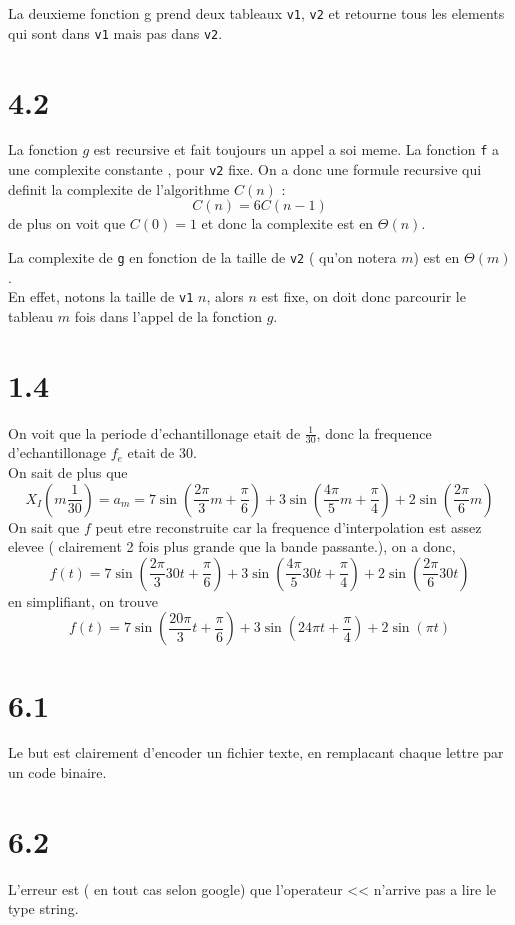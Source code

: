 \documentclass[11pt, a4paper, twoside]{article}
\begin{document}
La deuxieme fonction g prend deux tableaux \texttt{v1}, \texttt{v2} et retourne tous les elements qui sont dans \texttt{v1} mais pas dans \texttt{v2}.
\section*{4.2}
La fonction $g$ est recursive et fait toujours un appel a soi meme.
La fonction \texttt{f} a une complexite constante , pour \texttt{v2} fixe.
On a donc une formule recursive qui definit la complexite de l'algorithme $C( n) $  :
\[ 
	C( n) = 6C( n-1) 
\]
de plus on voit que $C( 0) =1$ et donc la complexite est en $\Theta( n) $.

La complexite de \texttt{g} en fonction de la taille de \texttt{v2} ( qu'on notera  $m$) est en $\Theta( m) $.\\
En effet, notons la taille de \texttt{v1}  $n$, alors $n$ est fixe, on doit donc parcourir le tableau $m$ fois dans l'appel de la fonction $g$.
\section*{1.4}
On voit que la periode d'echantillonage etait de $\frac{1}{30}$, donc la frequence d'echantillonage $f_e$ etait de $30$.\\
On sait de plus que
\[ 
	X_I( m \frac{1}{30}) = a_m = 7 \sin ( \frac{2\pi}{3}m + \frac{\pi}{6}) + 3 \sin ( \frac{4\pi}{5}m + \frac{\pi}{4}) + 2 \sin ( \frac{2\pi}{6}m) 
\]
On sait que $f$ peut etre reconstruite car la frequence d'interpolation est assez elevee ( clairement  2 fois plus grande que la bande passante.), on a donc,
\[ 
	f( t) = 7 \sin ( \frac{2\pi}{3}30 t + \frac{\pi}{6}) + 3 \sin ( \frac{4\pi}{5}30t + \frac{\pi}{4}) + 2 \sin ( \frac{2\pi}{6}30t) 
\]
en simplifiant, on trouve
\[ 
	f( t) = 7 \sin ( \frac{20\pi}{3} t + \frac{\pi}{6}) + 3 \sin ( 24\pi t + \frac{\pi}{4}) + 2 \sin ( \pi t) 
\]
\section*{6.1}
Le but est clairement d'encoder un fichier texte, en remplacant chaque lettre par un code binaire.
\section*{6.2}
L'erreur est ( en tout cas selon google) que l'operateur << n'arrive pas a lire le type string.
\end{document}
